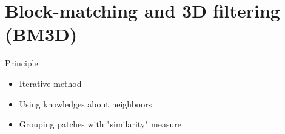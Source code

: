 \section{Block-matching and 3D filtering (BM3D)}
\frame{\sectionpage}

\begin{frame}{Principle}

\begin{itemize}
    \item Iterative method
    \item Using knowledges about neighboors
    \item Grouping patches with "similarity" measure
\end{itemize}

\end{frame}